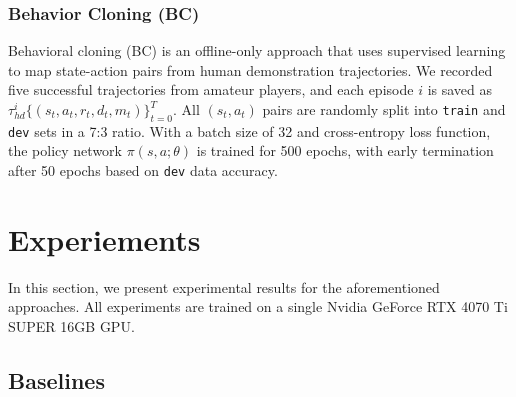 \documentclass{article}
\begin{document}
\subsubsection{Behavior Cloning (BC)}
Behavioral cloning (BC) is an offline-only approach that uses supervised 
learning to map state-action pairs from human demonstration trajectories. We 
recorded five successful trajectories from amateur players, and each episode 
$i$ is saved as $\tau_{hd}^{i} \{(s_t, a_t, r_t, d_t, m_t)\}_{t=0}^{T}$. All 
$(s_t, a_t)$ pairs are randomly split into \texttt{train} and \texttt{dev} sets 
in a 7:3 ratio. With a batch size of 32 and cross-entropy loss function, the 
policy network $\pi(s,a;\theta)$ is trained for 500 epochs, with early 
termination after 50 epochs based on \texttt{dev} data accuracy.


\section{Experiements}
In this section, we present experimental results for the aforementioned 
approaches. All experiments are trained on a single Nvidia GeForce RTX 4070 Ti 
SUPER 16GB GPU.

\subsection{Baselines}
\end{document}
